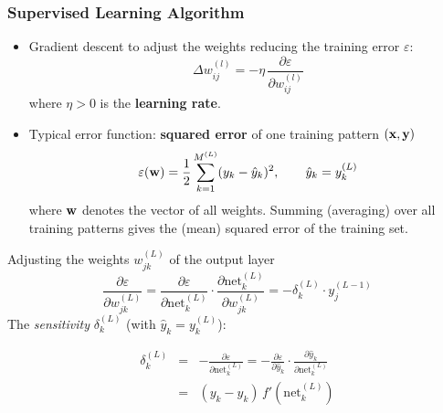   \subsubsection{Supervised Learning Algorithm}

  \begin{itemize}
    \item Gradient descent to adjust the weights reducing the training error $\varepsilon$:
      \begin{displaymath}
        \Delta w_{ij}^{(l)} = - \eta \, \frac{\partial \varepsilon}{\partial w_{ij}^{(l)}}
      \end{displaymath}
      where $\eta>0$ is the \textbf{learning rate}.

    \item Typical error function: \textbf{squared error} of one training pattern $(\bm{\mathrm{x}}, \bm{\mathrm{y}})$
      \begin{displaymath}
        \varepsilon(\bm{\mathrm{w}}) = \frac{1}{2} \sum_{k=1}^{M^{(L)}} (y_k - \hat y_k)^2, \qquad \hat y_k = y_k^{(L)}
      \end{displaymath}
      where $\bm{\mathrm{w}}$ denotes the vector of all weights. Summing (averaging) over all training patterns gives the (mean) squared error of the training set.
  \end{itemize}

\renewcommand{\err}{\varepsilon}
\newcommand{\net}[2]{\text{net}_{#1}^{(#2)}}
\newcommand{\w}[2]{w_{#1}^{(#2)}}
\newcommand{\y}[2]{y_{#1}^{(#2)}}

Adjusting the weights $\w{jk}{L}$ of the output layer
      \footnotesize
      \begin{displaymath}
        \frac{\partial \err}{\partial \w{jk}{L}} =
        \frac{\partial \err}{\partial \net{k}{L}} \cdot \frac{\partial \net{k}{L}}{\partial \w{jk}{L}} =
        - \delta_k^{(L)} \cdot y_j^{(L-1)}
      \end{displaymath}
   The \emph{sensitivity} $\delta_k^{(L)}$ (with $\hat y_k = \y{k}{L}$):

      \footnotesize
      \begin{eqnarray*}
        \delta_k^{(L)}
        & = & - \frac{\partial \err}{\partial \net{k}{L}}
          =   - \frac{\partial \err}{\partial \hat y_k} \cdot \frac{\partial \hat y_k}{\partial \net{k}{L}} \\
        & = & (y_k - \hat y_k) \, f'(\net{k}{L})
      \end{eqnarray*}

